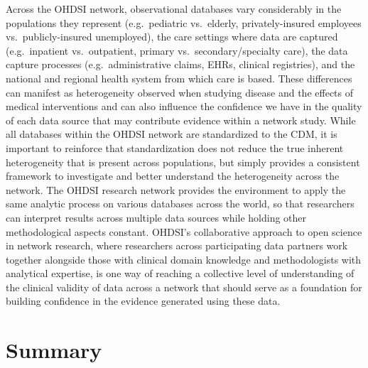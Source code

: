 \documentclass[11pt]{book}
\theoremstyle{definition}
\theoremstyle{definition}
\theoremstyle{definition}
\theoremstyle{remark}
\begin{document}
Across the OHDSI network, observational databases vary considerably in
the populations they represent (e.g.~pediatric vs.~elderly,
privately-insured employees vs.~publicly-insured unemployed), the care
settings where data are captured (e.g.~inpatient vs.~outpatient, primary
vs.~secondary/specialty care), the data capture processes
(e.g.~administrative claims, EHRs, clinical registries), and the
national and regional health system from which care is based. These
differences can manifest as heterogeneity observed when studying disease
and the effects of medical interventions and can also influence the
confidence we have in the quality of each data source that may
contribute evidence within a network study. While all databases within
the OHDSI network are standardized to the CDM, it is important to
reinforce that standardization does not reduce the true inherent
heterogeneity that is present across populations, but simply provides a
consistent framework to investigate and better understand the
heterogeneity across the network. The OHDSI research network provides
the environment to apply the same analytic process on various databases
across the world, so that researchers can interpret results across
multiple data sources while holding other methodological aspects
constant. OHDSI's collaborative approach to open science in network
research, where researchers across participating data partners work
together alongside those with clinical domain knowledge and
methodologists with analytical expertise, is one way of reaching a
collective level of understanding of the clinical validity of data
across a network that should serve as a foundation for building
confidence in the evidence generated using these data.

\section{Summary}\label{summary-10}
\end{document}
